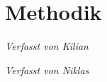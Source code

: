 \documentclass[../main.tex]{subfiles}
\begin{document}
\chapter{Methodik}
\vspace{-0.5cm}
\noindent\textit{\small Verfasst von Kilian}
\vspace{0.5cm}


\vspace{-0.5cm}
\noindent\textit{\small Verfasst von Niklas}
\vspace{0.5cm}
\end{document}
